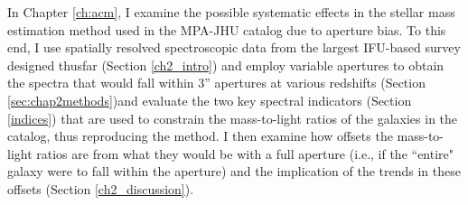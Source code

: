 In Chapter \ref{ch:acm}, I examine the possible systematic effects in the stellar mass estimation method used in the MPA-JHU catalog due to aperture bias. To this end, I use spatially resolved spectroscopic data from the largest IFU-based survey designed thusfar (Section \ref{ch2_intro}) and employ variable apertures to obtain the spectra that would fall within 3'' apertures at various redshifts (Section \ref{sec:chap2methods})and evaluate the two key spectral indicators (Section \ref{indices}) that are used to constrain the mass-to-light ratios of the galaxies in the catalog, thus reproducing the \citet{kauffmann_stellar_2003} method. I then examine how offsets the mass-to-light ratios are from what they would be with a full aperture (i.e., if the ``entire" galaxy were to fall within the aperture) and the implication of the trends in these offsets (Section \ref{ch2_discussion}).\\






